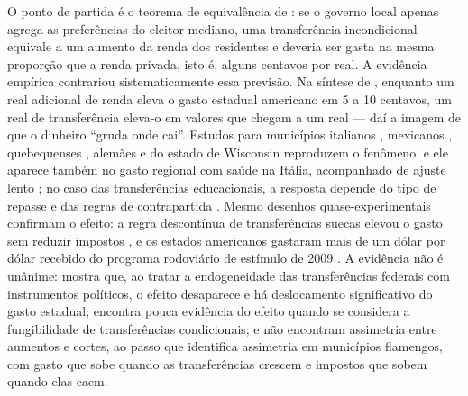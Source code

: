 O ponto de partida é o teorema de equivalência de : se o governo local apenas agrega as preferências do eleitor mediano, uma transferência incondicional equivale a um aumento da renda dos residentes e deveria ser gasta na mesma proporção que a renda privada, isto é, alguns centavos por real. A evidência empírica contrariou sistematicamente essa previsão. Na síntese de , enquanto um real adicional de renda eleva o gasto estadual americano em 5 a 10 centavos, um real de transferência eleva-o em valores que chegam a um real --- daí a imagem de que o dinheiro ``gruda onde cai''. Estudos para municípios italianos \cite{gennari2014}, mexicanos \cite{cardenas2011}, quebequenses \cite{mehiriz2014}, alemães \cite{baskaran2015} e do estado de Wisconsin \cite{deller2005} reproduzem o fenômeno, e ele aparece também no gasto regional com saúde na Itália, acompanhado de ajuste lento \cite{levaggi2003}; no caso das transferências educacionais, a resposta depende do tipo de repasse e das regras de contrapartida \cite{fisher2000}. Mesmo desenhos quase-experimentais confirmam o efeito: a regra descontínua de transferências suecas elevou o gasto sem reduzir impostos \cite{dahlberg2008}, e os estados americanos gastaram mais de um dólar por dólar recebido do programa rodoviário de estímulo de 2009 \cite{leduc2017}. A evidência não é unânime:  mostra que, ao tratar a endogeneidade das transferências federais com instrumentos políticos, o efeito desaparece e há deslocamento significativo do gasto estadual;  encontra pouca evidência do efeito quando se considera a fungibilidade de transferências condicionais; e  não encontram assimetria entre aumentos e cortes, ao passo que  identifica assimetria em municípios flamengos, com gasto que sobe quando as transferências crescem e impostos que sobem quando elas caem.


